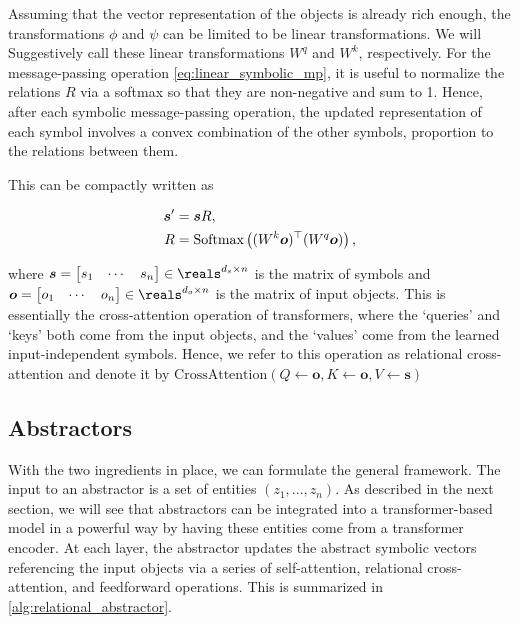 Assuming that the vector representation of the objects is already rich enough, the transformations $\phi$ and $\psi$ can be limited to be linear transformations. We will Suggestively call these linear transformations $W^q$ and $W^k$, respectively. For the message-passing operation \cref{eq:linear_symbolic_mp}, it is useful to normalize the relations $R$ via a softmax so that they are non-negative and sum to 1. Hence, after each symbolic message-passing operation, the updated representation of each symbol involves a convex combination of the other symbols, proportion to the relations between them.

This can be compactly written as

\begin{equation}
    \label{eq:relational_crossattention}
    \begin{split}
        \boldsymbol{s}' &= \boldsymbol{s} R, \\
        R &= \text{Softmax}\left((W^k \boldsymbol{o})^\top (W^q \boldsymbol{o})\right),
    \end{split}
\end{equation}

\noindent where $\boldsymbol{s} = \begin{bmatrix}s_1 & \cdots & s_n \end{bmatrix} \in \reals^{d_s \times n}$ is the matrix of symbols and $\boldsymbol{o} = \begin{bmatrix}o_1 & \cdots & o_n \end{bmatrix} \in \reals^{d_o \times n}$ is the matrix of input objects. This is essentially the cross-attention operation of transformers, where the `queries' and `keys' both come from the input objects, and the `values' come from the learned input-independent symbols. Hence, we refer to this operation as relational cross-attention and denote it by $\text{CrossAttention}(Q \gets \boldsymbol{o}, K \gets \boldsymbol{o}, V \gets \boldsymbol{s})$

\subsection{Abstractors}

With the two ingredients in place, we can formulate the general framework. The input to an abstractor is a set of entities $(z_1, ..., z_n)$. As described in the next section, we will see that abstractors can be integrated into a transformer-based model in a powerful way by having these entities come from a transformer encoder. At each layer, the abstractor updates the abstract symbolic vectors referencing the input objects via a series of self-attention, relational cross-attention, and feedforward operations. This is summarized in \ref{alg:relational_abstractor}.

